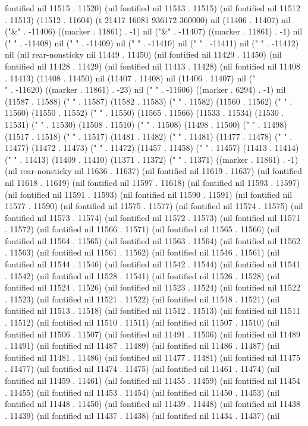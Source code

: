fontified nil 11515 . 11520) (nil fontified nil 11513 . 11515) (nil fontified nil 11512 . 11513) (11512 . 11604) (t 21417 16081 936172 360000) nil (11406 . 11407) nil ("&" . -11406) ((marker . 11861) . -1) nil ("&" . -11407) ((marker . 11861) . -1) nil (" " . -11408) nil (" " . -11409) nil (" " . -11410) nil (" " . -11411) nil (" " . -11412) nil (nil rear-nonsticky nil 11449 . 11450) (nil fontified nil 11429 . 11450) (nil fontified nil 11428 . 11429) (nil fontified nil 11413 . 11428) (nil fontified nil 11408 . 11413) (11408 . 11450) nil (11407 . 11408) nil (11406 . 11407) nil ("   \\[
 \\begin{aligned}
    \\end{aligned}
   \\]
" . -11620) ((marker . 11861) . -23) nil ("
" . -11606) ((marker . 6294) . -1) nil (11587 . 11588) ("                     " . 11587) (11582 . 11583) ("  " . 11582) (11560 . 11562) (" " . 11560) (11550 . 11552) (" " . 11550) (11565 . 11566) (11533 . 11534) (11530 . 11531) ("  " . 11530) (11508 . 11510) ("   " . 11508) (11498 . 11500) ("   " . 11498) (11517 . 11518) ("  " . 11517) (11481 . 11482) ("  " . 11481) (11477 . 11478) ("     " . 11477) (11472 . 11473) ("  " . 11472) (11457 . 11458) ("  " . 11457) (11413 . 11414) ("  " . 11413) (11409 . 11410) (11371 . 11372) ("   " . 11371) ((marker . 11861) . -1) (nil rear-nonsticky nil 11636 . 11637) (nil fontified nil 11619 . 11637) (nil fontified nil 11618 . 11619) (nil fontified nil 11597 . 11618) (nil fontified nil 11593 . 11597) (nil fontified nil 11591 . 11593) (nil fontified nil 11590 . 11591) (nil fontified nil 11577 . 11590) (nil fontified nil 11575 . 11577) (nil fontified nil 11574 . 11575) (nil fontified nil 11573 . 11574) (nil fontified nil 11572 . 11573) (nil fontified nil 11571 . 11572) (nil fontified nil 11566 . 11571) (nil fontified nil 11565 . 11566) (nil fontified nil 11564 . 11565) (nil fontified nil 11563 . 11564) (nil fontified nil 11562 . 11563) (nil fontified nil 11561 . 11562) (nil fontified nil 11546 . 11561) (nil fontified nil 11544 . 11546) (nil fontified nil 11542 . 11544) (nil fontified nil 11541 . 11542) (nil fontified nil 11528 . 11541) (nil fontified nil 11526 . 11528) (nil fontified nil 11524 . 11526) (nil fontified nil 11523 . 11524) (nil fontified nil 11522 . 11523) (nil fontified nil 11521 . 11522) (nil fontified nil 11518 . 11521) (nil fontified nil 11513 . 11518) (nil fontified nil 11512 . 11513) (nil fontified nil 11511 . 11512) (nil fontified nil 11510 . 11511) (nil fontified nil 11507 . 11510) (nil fontified nil 11506 . 11507) (nil fontified nil 11491 . 11506) (nil fontified nil 11489 . 11491) (nil fontified nil 11487 . 11489) (nil fontified nil 11486 . 11487) (nil fontified nil 11481 . 11486) (nil fontified nil 11477 . 11481) (nil fontified nil 11475 . 11477) (nil fontified nil 11474 . 11475) (nil fontified nil 11461 . 11474) (nil fontified nil 11459 . 11461) (nil fontified nil 11455 . 11459) (nil fontified nil 11454 . 11455) (nil fontified nil 11453 . 11454) (nil fontified nil 11450 . 11453) (nil fontified nil 11448 . 11450) (nil fontified nil 11439 . 11448) (nil fontified nil 11438 . 11439) (nil fontified nil 11437 . 11438) (nil fontified nil 11434 . 11437) (nil 